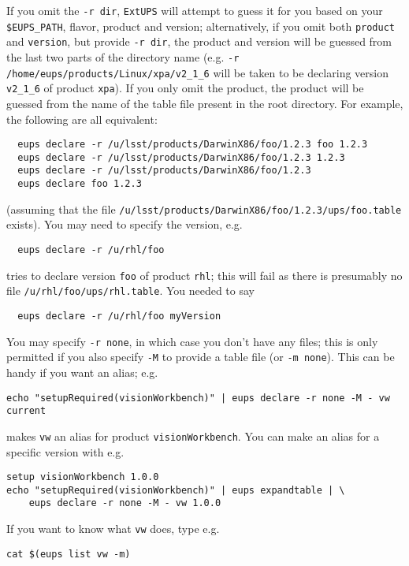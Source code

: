 \documentclass{article}
\newcommand{\code}[1]{\texttt{#1}}
\newcommand{\eups}{\code{ExtUPS}}
\begin{document}
\begin{itemize}
If you omit the \code{-r dir}, \eups{} will attempt to guess it for you based
on your \code{\$EUPS\_PATH}, flavor, product and version; alternatively,
if you omit both \code{product} and \code{version}, but provide \code{-r dir},
the product and version will be guessed from the last two parts of the directory
name (e.g. \code{-r /home/eups/products/Linux/xpa/v2\_1\_6} will be taken to be
declaring version \code{v2\_1\_6} of product \code{xpa}).  If you only omit
the product, the product will be guessed from the name of the table file
present in the root directory. For example, the following are all equivalent:
\begin{verbatim}
  eups declare -r /u/lsst/products/DarwinX86/foo/1.2.3 foo 1.2.3
  eups declare -r /u/lsst/products/DarwinX86/foo/1.2.3 1.2.3
  eups declare -r /u/lsst/products/DarwinX86/foo/1.2.3
  eups declare foo 1.2.3
\end{verbatim}
(assuming that the file \code{/u/lsst/products/DarwinX86/foo/1.2.3/ups/foo.table}
exists). You may need to specify the version, e.g.
\begin{verbatim}
  eups declare -r /u/rhl/foo
\end{verbatim}
tries to declare version \code{foo} of product \code{rhl}; this will fail as
there is presumably no file \code{/u/rhl/foo/ups/rhl.table}.  You needed to say
\begin{verbatim}
  eups declare -r /u/rhl/foo myVersion
\end{verbatim}

You may specify \code{-r none}, in which case you don't have any files; this
is only permitted if you also specify \code{-M} to provide a table file (or \code{-m none}).
This can be handy if you want an alias; e.g.
\begin{verbatim}
echo "setupRequired(visionWorkbench)" | eups declare -r none -M - vw current
\end{verbatim}
makes \code{vw} an alias for product \code{visionWorkbench}. You can make
an alias for a specific version with e.g.
\begin{verbatim}
setup visionWorkbench 1.0.0
echo "setupRequired(visionWorkbench)" | eups expandtable | \
	eups declare -r none -M - vw 1.0.0
\end{verbatim}

If you want to
know what \code{vw} does, type e.g.
\begin{verbatim}
cat $(eups list vw -m)
\end{verbatim}				%


\end{itemize}
\end{document}
